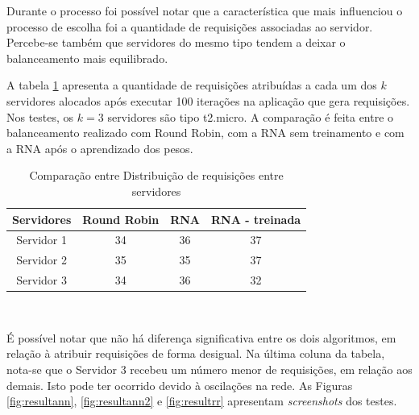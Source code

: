 Durante o processo foi possível notar que a característica que mais influenciou o processo de escolha foi a quantidade de requisições associadas ao servidor. Percebe-se também que servidores do mesmo tipo tendem a deixar o balanceamento mais equilibrado. 

A tabela \ref{tab:results} apresenta a quantidade de requisições atribuídas a cada um dos $k$ servidores alocados após executar 100 iterações na aplicação que gera requisições. Nos testes, os $k=3$ servidores são tipo t2.micro. A comparação é feita entre o balanceamento realizado com Round Robin, com a RNA sem treinamento e com a RNA após o aprendizado dos pesos.  

\begin{table}[ht]
	\caption{Comparação entre Distribuição de requisições entre servidores}
	\centering
	\begin{tabular}{c c c c}
		\hline 
		Servidores & Round Robin & RNA & RNA - treinada\\ 
		\hline 
		Servidor 1 & 34 & 36 & 37 \\ 
		\hline 
		Servidor 2 & 35 & 35 & 37 \\ 
		\hline 
		Servidor 3 & 34 & 36 & 32 \\ 
		\hline 
	\end{tabular} \\
	\vspace{3mm}
	\label{tab:results}
\end{table}

É possível notar que não há diferença significativa entre os dois algoritmos, em relação à atribuir requisições de forma desigual. Na última coluna da tabela, nota-se que o Servidor 3 recebeu um número menor de requisições, em relação aos demais. Isto pode ter ocorrido devido à oscilações na rede. As Figuras \ref{fig:resultann}, \ref{fig:resultann2} e \ref{fig:resultrr} apresentam \textit{screenshots} dos testes. 

